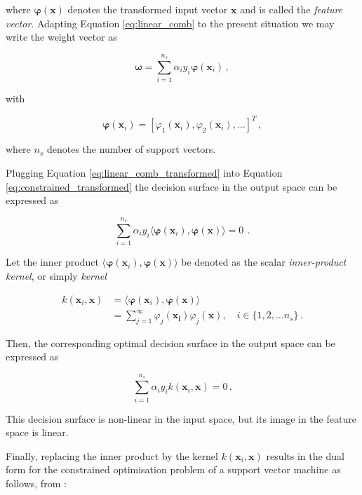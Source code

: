 \noindent
where $\bm{\varphi}(\bm{x})$ denotes the transformed input vector $\bm{x}$ and is called the \emph{feature vector}. Adapting Equation \ref{eq:linear_comb} to the present situation we may write the weight vector as

\begin{equation}
\bm{\omega} = \sum_{i=1}^{n_s} \alpha_i y_i \bm{\varphi}(\bm{x}_i) \,,
\label{eq:linear_comb_transformed}
\end{equation}

\noindent
with

\begin{equation}
\bm{\varphi}(\bm{x}_i) = [\varphi_1(\bm{x}_i), \varphi_2(\bm{x}_i), \dots]^T\,,
\end{equation}

\noindent
where $n_s$ denotes the number of support vectors.

\noindent
Plugging Equation \ref{eq:linear_comb_transformed} into Equation \ref{eq:constrained_transformed} the decision surface in the output space can be expressed as 

\begin{equation}
\sum_{i=1}^{n_s} \alpha_i y_i \langle \bm{\varphi}(\bm{x}_i) , \bm{\varphi}(\bm{x}) \rangle = 0\ \,.
\end{equation}

\noindent
Let the inner product $\langle \bm{\varphi}(\bm{x}_i) , \bm{\varphi}(\bm{x}) \rangle$ be denoted as the scalar \emph{inner-product kernel}, or simply \emph{kernel}

\begin{equation}
\begin{split}
k(\bm{x}_i, \bm{x}) & = \langle \bm{\varphi}(\bm{x}_i) , \bm{\varphi} (\bm{x}) \rangle\ \\
& = \sum_{j = 1}^{\infty} \varphi_j(\bm{x_i}) \varphi_j(\bm{x}), \quad i \in \{1, 2, \dots n_s\}\,.
\end{split}
\end{equation}

\noindent
Then, the corresponding optimal decision surface in the output space can be expressed as 

\begin{equation}
\sum_{i=1}^{n_s} \alpha_i y_i k(\bm{x}_i, \bm{x}) = 0 \,.
\end{equation}

\noindent
This decision surface is non-linear in the input space, but its image in the feature space is linear.

Finally, replacing the inner product by the kernel $k(\bm{x}_i, \bm{x})$ results in the dual form for the constrained optimisation problem of a support vector machine as follows, from \cite{haykin2009neural}:

